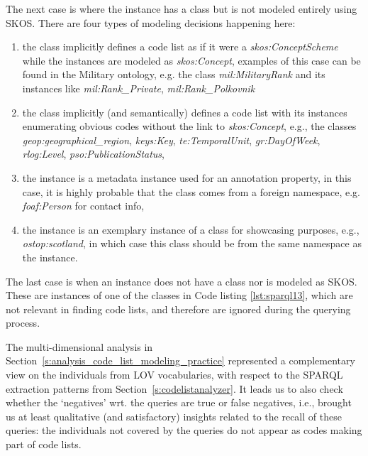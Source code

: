 The next case is where the instance has a class but is not modeled entirely using SKOS. There are four types of modeling decisions happening here:
\begin{enumerate}
    \item the class implicitly defines a code list as if it were a \textit{skos:ConceptScheme} while the instances are modeled as \textit{skos:Concept}, examples of this case can be found in the Military ontology, e.g. the class \textit{mil:MilitaryRank} and its instances like \textit{mil:Rank\_Private}, \textit{mil:Rank\_Polkovnik}
    \item the class implicitly (and semantically) defines a code list with its instances enumerating obvious codes without the link to \textit{skos:Concept}, e.g., the classes \textit{geop:geographical\_region}, \textit{keys:Key}, \textit{te:TemporalUnit}, \textit{gr:DayOfWeek}, \textit{rlog:Level}, \textit{pso:PublicationStatus},
    \item the instance is a metadata instance used for an annotation property, in this case, it is highly probable that the class comes from a foreign namespace, e.g. \textit{foaf:Person} for contact info,
    \item the instance is an exemplary instance of a class for showcasing purposes, e.g., \textit{ostop:scotland}, in which case this class should be from the same namespace as the instance.
\end{enumerate}

The last case is when an instance does not have a class nor is modeled as SKOS. These are instances of one of the classes in Code listing \ref{lst:sparql13}, which are not relevant in finding code lists, and therefore are ignored during the querying process.

The multi-dimensional analysis in Section~\ref{s:analysis_code_list_modeling_practice} represented a complementary view on the individuals from LOV vocabularies, with respect to the SPARQL extraction patterns from Section~\ref{s:codelistanalyzer}.
It leads us to also check whether the `negatives' wrt. the queries are true or false negatives, i.e., brought us at least qualitative (and satisfactory) insights related to the recall of these queries: the individuals not covered by the queries do not appear as codes making part of code lists.



